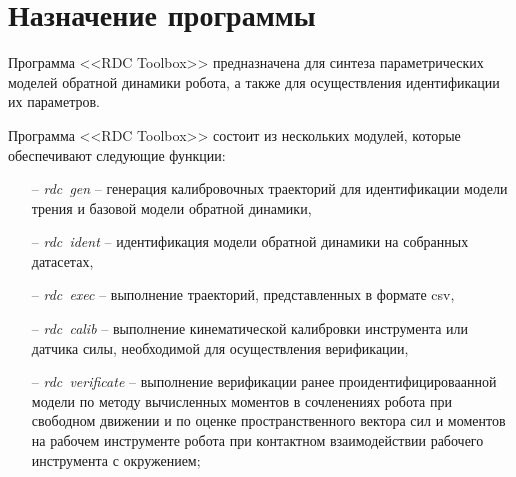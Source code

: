 \newpage
\section{Назначение программы}


Программа <<RDC Toolbox>> предназначена для синтеза параметрических моделей обратной динамики робота, а также для осуществления идентификации их параметров.

Программа <<RDC Toolbox>> состоит из нескольких модулей, которые обеспечивают следующие функции:
\begin{enumerate}
    \item[--] \textit{rdc~gen} -- генерация калибровочных траекторий для идентификации модели трения и базовой модели обратной динамики,
    \item[--] \textit{rdc~ident} -- идентификация модели обратной динамики на собранных датасетах,
    \item[--] \textit{rdc~exec} -- выполнение траекторий, представленных в формате csv,
    \item[--] \textit{rdc~calib} -- выполнение кинематической калибровки инструмента или датчика силы, необходимой для осуществления верификации,
    \item[--] \textit{rdc~verificate} -- выполнение верификации ранее проидентифицироваанной модели по методу вычисленных моментов в сочленениях робота при свободном движении и по оценке пространственного вектора сил и моментов на рабочем инструменте робота при контактном взаимодействии рабочего инструмента с окружением;
\end{enumerate}